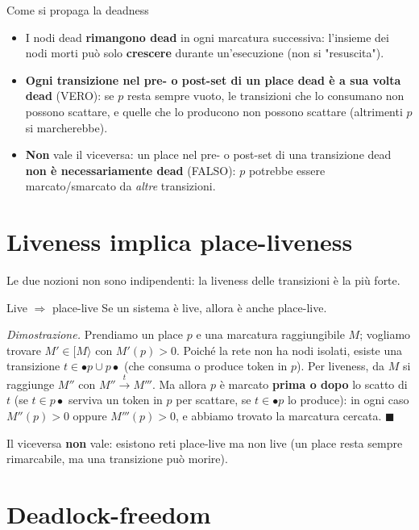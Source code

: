 \begin{boxnote}{Come si propaga la deadness}
\begin{itemize}
\item I nodi dead \textbf{rimangono dead} in ogni marcatura successiva: l'insieme dei nodi morti può solo \textbf{crescere} durante un'esecuzione (non si "resuscita").
\item \textbf{Ogni transizione nel pre- o post-set di un place dead è a sua volta dead} (VERO): se $p$ resta sempre vuoto, le transizioni che lo consumano non possono scattare, e quelle che lo producono non possono scattare (altrimenti $p$ si marcherebbe).
\item \textbf{Non} vale il viceversa: un place nel pre- o post-set di una transizione dead \textbf{non è necessariamente dead} (FALSO): $p$ potrebbe essere marcato/smarcato da \emph{altre} transizioni.
\end{itemize}
\end{boxnote}

\section{\texorpdfstring{Liveness implica place-liveness}{Liveness implica place-liveness}}

Le due nozioni non sono indipendenti: la liveness delle transizioni è la più forte.

\begin{boxtheorem}{Live $\Longrightarrow$ place-live}
Se un sistema è live, allora è anche place-live.

\emph{Dimostrazione.} Prendiamo un place $p$ e una marcatura raggiungibile $M$; vogliamo trovare $M' \in [M\rangle$ con $M'(p) > 0$. Poiché la rete non ha nodi isolati, esiste una transizione $t \in \bullet p \cup p\bullet$ (che consuma o produce token in $p$). Per liveness, da $M$ si raggiunge $M''$ con $M'' \xrightarrow{t} M'''$. Ma allora $p$ è marcato \textbf{prima o dopo} lo scatto di $t$ (se $t \in p\bullet$ serviva un token in $p$ per scattare, se $t \in \bullet p$ lo produce): in ogni caso $M''(p) > 0$ oppure $M'''(p) > 0$, e abbiamo trovato la marcatura cercata. $\blacksquare$
\end{boxtheorem}

Il viceversa \textbf{non} vale: esistono reti place-live ma non live (un place resta sempre rimarcabile, ma una transizione può morire).

\section{\texorpdfstring{Deadlock-freedom}{Deadlock-freedom}}

